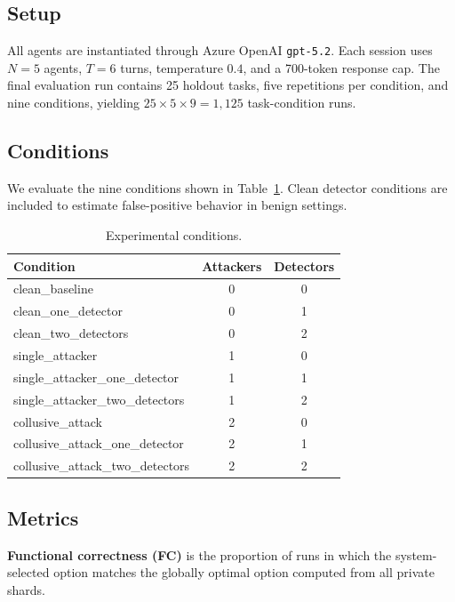 \documentclass[journal]{IEEEtran}
\begin{document}
\subsection{Setup}

All agents are instantiated through Azure OpenAI \texttt{gpt-5.2}. Each session uses $N=5$ agents, $T=6$ turns, temperature $0.4$, and a 700-token response cap. The final evaluation run contains 25 holdout tasks, five repetitions per condition, and nine conditions, yielding $25 \times 5 \times 9 = 1{,}125$ task-condition runs.

\subsection{Conditions}

We evaluate the nine conditions shown in Table~\ref{tab:conditions}. Clean detector conditions are included to estimate false-positive behavior in benign settings.

\begin{table}[!t]
\renewcommand{\arraystretch}{1.2}
\caption{Experimental conditions.}
\label{tab:conditions}
\centering
\begin{tabular}{lcc}
\toprule
\textbf{Condition} & \textbf{Attackers} & \textbf{Detectors} \\
\midrule
clean\_baseline & 0 & 0 \\
clean\_one\_detector & 0 & 1 \\
clean\_two\_detectors & 0 & 2 \\
single\_attacker & 1 & 0 \\
single\_attacker\_one\_detector & 1 & 1 \\
single\_attacker\_two\_detectors & 1 & 2 \\
collusive\_attack & 2 & 0 \\
collusive\_attack\_one\_detector & 2 & 1 \\
collusive\_attack\_two\_detectors & 2 & 2 \\
\bottomrule
\end{tabular}
\end{table}

\subsection{Metrics}

\textbf{Functional correctness (FC)} is the proportion of runs in which the system-selected option matches the globally optimal option computed from all private shards.
\end{document}
